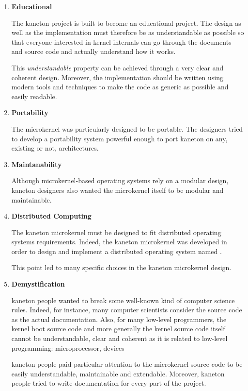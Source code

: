 \begin{enumerate}
  \item
    \textbf{Educational}

    \-

    The kaneton project is built to become an educational project. The design
    as well as the implementation must therefore be as understandable as
    possible so that everyone interested in kernel internals can go through the
    documents and source code and actually understand how it works.

    \-

    This \textit{understandable} property can be achieved through a very clear
    and coherent design. Moreover, the implementation should be written using
    modern tools and techniques to make the code as generic as possible and
    easily readable.
  \item
    \textbf{Portability}

    \-

    The microkernel was particularly designed to be portable. The designers
    tried to develop a portability system powerful enough to port kaneton on
    any, existing or not, architectures.
  \item
    \textbf{Maintanability}

    \-

    Although microkernel-based operating systems rely on a modular design,
    kaneton designers also wanted the microkernel itself to be modular and
    maintainable.
  \item
    \textbf{Distributed Computing}

    \-

    The kaneton microkernel must be designed to fit distributed operating
    systems requirements. Indeed, the kaneton microkernel was developed in
    order to design and implement a distributed operating system named
    .

    \-

    This point led to many specific choices in the kaneton microkernel design.
  \item
    \textbf{Demystification}

    \-

    kaneton people wanted to break some well-known kind of computer
    science rules. Indeed, for instance, many computer scientists consider
    the source code as the actual documentation. Also, for many low-level
    programmers, the kernel boot source code and more generally the
    kernel source code itself cannot be understandable, clear and coherent as
    it is related to low-level programming: microprocessor, devices \etc{}

    kaneton people paid particular attention to the microkernel source code to
    be easily understandable, maintainable and extendable. Moreover, kaneton
    people tried to write documentation for every part of the project.
\end{enumerate}

